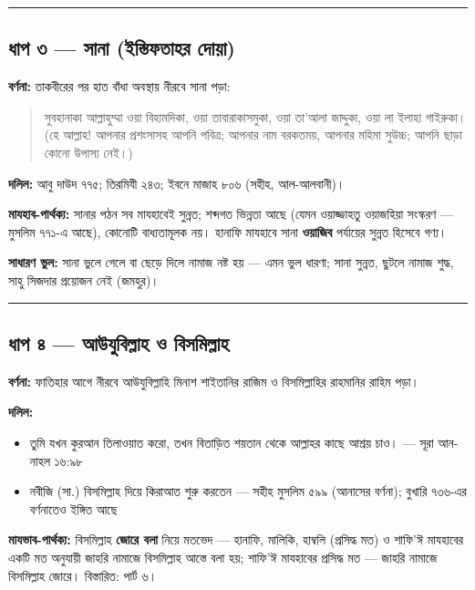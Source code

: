 \medskip\hrule\medskip

\subsection*{ধাপ ৩ — সানা (ইস্তিফতাহর দোয়া)}

\textbf{বর্ণনা:} তাকবীরের পর হাত বাঁধা অবস্থায় নীরবে সানা পড়া:

\begin{quote}
সুবহানাকা আল্লাহুম্মা ওয়া বিহামদিকা, ওয়া তাবারাকাসমুকা, ওয়া তা'আলা জাদ্দুকা, ওয়া লা ইলাহা গাইরুকা। (হে আল্লাহ! আপনার প্রশংসাসহ আপনি পবিত্র; আপনার নাম বরকতময়, আপনার মহিমা সুউচ্চ; আপনি ছাড়া কোনো উপাস্য নেই।)
\end{quote}

\textbf{দলিল:} আবু দাউদ ৭৭৫; তিরমিযী ২৪৩; ইবনে মাজাহ ৮০৬ (সহীহ, আল-আলবানী)।

\textbf{মাযহাব-পার্থক্য:} সানার পঠন সব মাযহাবেই সুন্নত; শব্দগত ভিন্নতা আছে (যেমন ওয়াজ্জাহতু ওয়াজহিয়া সংস্করণ — মুসলিম ৭৭১-এ আছে), কোনোটি বাধ্যতামূলক নয়। হানাফি মাযহাবে সানা \textbf{ওয়াজিব} পর্যায়ের সুন্নত হিসেবে গণ্য।

\textbf{সাধারণ ভুল:} সানা ভুলে গেলে বা ছেড়ে দিলে নামাজ নষ্ট হয় — এমন ভুল ধারণা; সানা সুন্নত, ছুটলে নামাজ শুদ্ধ, সাহু সিজদার প্রয়োজন নেই (জমহুর)।

\medskip\hrule\medskip

\subsection*{ধাপ ৪ — আউযুবিল্লাহ ও বিসমিল্লাহ}

\textbf{বর্ণনা:} ফাতিহার আগে নীরবে আউযুবিল্লাহি মিনাশ শাইতানির রাজিম ও বিসমিল্লাহির রাহমানির রাহিম পড়া।

\textbf{দলিল:}
\begin{itemize}
\item {}তুমি যখন কুরআন তিলাওয়াত করো, তখন বিতাড়িত শয়তান থেকে আল্লাহর কাছে আশ্রয় চাও। — সূরা আন-নাহল ১৬:৯৮
\item নবীজি (সা.) বিসমিল্লাহ দিয়ে কিরাআত শুরু করতেন — সহীহ মুসলিম ৫৯৯ (আনাসের বর্ণনা); বুখারি ৭৩৬-এর বর্ণনাতেও ইঙ্গিত আছে
\end{itemize}
\textbf{মাযভাব-পার্থক্য:} বিসমিল্লাহ \textbf{জোরে বলা} নিয়ে মতভেদ — হানাফি, মালিকি, হাম্বলি (প্রসিদ্ধ মত) ও শাফি'ঈ মাযহাবের একটি মত অনুযায়ী জাহরি নামাজে বিসমিল্লাহ আস্তে বলা হয়; শাফি'ঈ মাযহাবের প্রসিদ্ধ মত — জাহরি নামাজে বিসমিল্লাহ জোরে। বিস্তারিত: পার্ট ৬।

